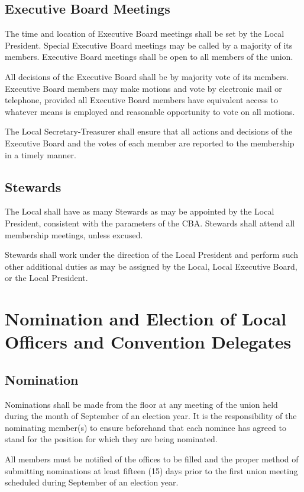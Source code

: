 \documentclass[12pt]{article}
\begin{document}
\subsection{Executive Board Meetings}
The time and location of Executive Board meetings shall be set by the Local President. Special Executive Board meetings may be called by a majority of its members. Executive Board meetings shall be open to all members of the union.

All decisions of the Executive Board shall be by majority vote of its members. Executive Board members may make motions and vote by electronic mail or telephone, provided all Executive Board members have equivalent access to whatever means is employed and reasonable opportunity to vote on all motions.

The Local Secretary-Treasurer shall ensure that all actions and decisions of the Executive Board and the votes of each member are reported to the membership in a timely manner.

\subsection{Stewards}
The Local shall have as many Stewards as may be appointed by the Local President, consistent with the parameters of the CBA. Stewards shall attend all membership meetings, unless excused.

Stewards shall work under the direction of the Local President and perform such other additional duties as may be assigned by the Local, Local Executive Board, or the Local President.

\section{Nomination and Election of Local Officers and Convention Delegates}
\subsection{Nomination}
Nominations shall be made from the floor at any meeting of the union held during the month of September of an election year. It is the responsibility of the nominating member(s) to ensure beforehand that each nominee has agreed to stand for the position for which they are being nominated.

All members must be notified of the offices to be filled and the proper method of submitting nominations at least fifteen (15) days prior to the first union meeting scheduled during September of an election year.
\end{document}
